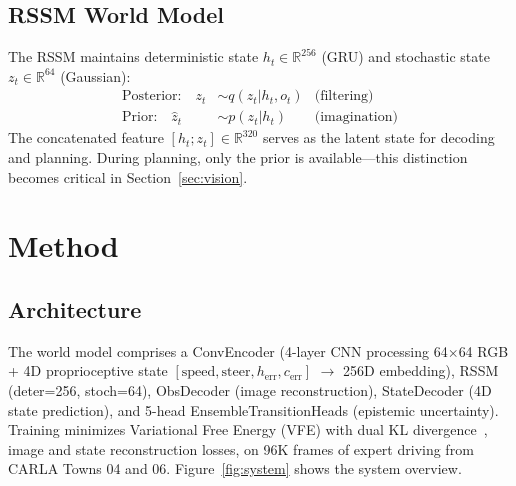 \documentclass{article}
\begin{document}
\subsection{RSSM World Model}

The RSSM maintains deterministic state $h_t \in \mathbb{R}^{256}$
(GRU) and stochastic state $z_t \in \mathbb{R}^{64}$ (Gaussian):
\begin{align}
    \text{Posterior:} \quad z_t &\sim q(z_t | h_t, o_t) & \text{(filtering)} \\
    \text{Prior:} \quad \hat{z}_t &\sim p(z_t | h_t) & \text{(imagination)}
\end{align}
The concatenated feature $[h_t; z_t] \in \mathbb{R}^{320}$ serves
as the latent state for decoding and planning. During planning,
only the prior is available---this distinction becomes critical in
Section~\ref{sec:vision}.

\section{Method}

\subsection{Architecture}

The world model comprises a ConvEncoder (4-layer CNN processing
64$\times$64 RGB + 4D proprioceptive state
$[\text{speed}, \text{steer}, h_{\text{err}}, c_{\text{err}}]$
$\rightarrow$ 256D embedding), RSSM (deter=256, stoch=64),
ObsDecoder (image reconstruction), StateDecoder (4D state
prediction), and 5-head EnsembleTransitionHeads (epistemic
uncertainty). Training minimizes Variational Free Energy (VFE)
with dual KL divergence~\citep{hafner2023mastering}, image and
state reconstruction losses, on 96K frames of expert driving from
CARLA Towns 04 and 06. Figure~\ref{fig:system} shows the system
overview.
\end{document}
